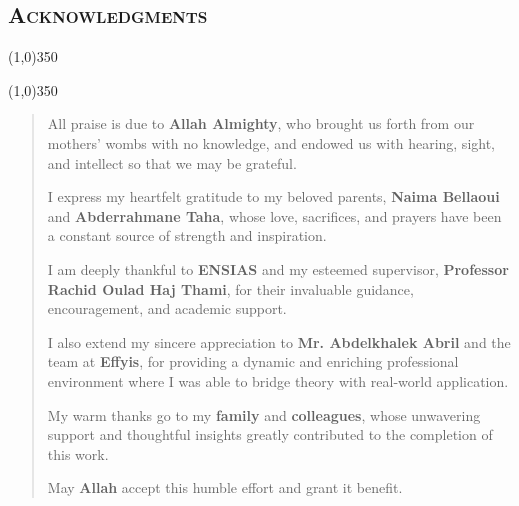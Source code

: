\vspace*{1cm}

\begin{center}
    \section*{\Large \textsc{Acknowledgments}}
\end{center}

\begin{center}
    \line(1,0){350}
\end{center}

\begin{center}
    \line(1,0){350}
\end{center}

\begin{quotation}
\vspace{0.3cm}

\noindent All praise is due to \textbf{Allah Almighty}, who brought us forth from our mothers’ wombs with no knowledge, and endowed us with hearing, sight, and intellect so that we may be grateful.
\vspace{0.6cm}

\noindent I express my heartfelt gratitude to my beloved parents, \textbf{Naima Bellaoui} and \textbf{Abderrahmane Taha}, whose love, sacrifices, and prayers have been a constant source of strength and inspiration.
\vspace{0.6cm}

\noindent I am deeply thankful to \textbf{ENSIAS} and my esteemed supervisor, \textbf{Professor Rachid Oulad Haj Thami}, for their invaluable guidance, encouragement, and academic support.
\vspace{0.6cm}

\noindent I also extend my sincere appreciation to \textbf{Mr. Abdelkhalek Abril} and the team at \textbf{Effyis}, for providing a dynamic and enriching professional environment where I was able to bridge theory with real-world application.
\vspace{0.6cm}

\noindent My warm thanks go to my \textbf{family} and \textbf{colleagues}, whose unwavering support and thoughtful insights greatly contributed to the completion of this work.
\vspace{0.6cm}

\begin{center}
    May \textbf{Allah} accept this humble effort and grant it benefit.
\end{center}

\end{quotation}

\vspace{1cm}
\pagebreak
